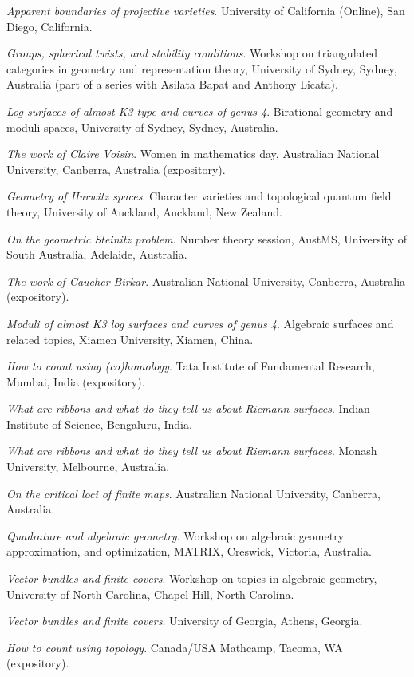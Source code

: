 \documentclass[11pt]{article}
\begin{document}
\begin{description}
\emph{Apparent boundaries of projective varieties}.
University of California (Online), San Diego, California.
\item[{2019}] \emph{Groups, spherical twists, and stability conditions}.
Workshop on triangulated categories in geometry and representation theory, University of Sydney, Sydney, Australia (part of a series with Asilata Bapat and Anthony Licata).

\emph{Log surfaces of almost K3 type and curves of genus 4}.
Birational geometry and moduli spaces, University of Sydney, Sydney, Australia.

\emph{The work of Claire Voisin}.
Women in mathematics day, Australian National University, Canberra, Australia (expository).
\item[{2018}] \emph{Geometry of Hurwitz spaces}.
Character varieties and topological quantum field theory, University of Auckland, Auckland, New Zealand.

\emph{On the geometric Steinitz problem}.
Number theory session,  AustMS, University of South Australia, Adelaide, Australia.

\emph{The work of Caucher Birkar}.
Australian National University, Canberra, Australia (expository).

\emph{Moduli of almost K3 log surfaces and curves of genus 4}.
Algebraic surfaces and related topics, Xiamen University, Xiamen, China.

\emph{How to count using (co)homology}.
Tata Institute of Fundamental Research, Mumbai, India (expository).

\emph{What are ribbons and what do they tell us about Riemann surfaces}.
Indian Institute of Science, Bengaluru, India.

\emph{What are ribbons and what do they tell us about Riemann surfaces}.
Monash University, Melbourne, Australia.

\emph{On the critical loci of finite maps}.
Australian National University, Canberra, Australia.

\emph{Quadrature and algebraic geometry}.
Workshop on algebraic geometry approximation, and optimization, MATRIX, Creswick, Victoria, Australia.
\item[{2017}] \emph{Vector bundles and finite covers}.
Workshop on topics in algebraic geometry, University of North Carolina, Chapel Hill, North Carolina.

\emph{Vector bundles and finite covers}.
University of Georgia, Athens, Georgia.

\emph{How to count using topology}.
Canada/USA Mathcamp, Tacoma, WA (expository).


\end{description}
\end{document}
